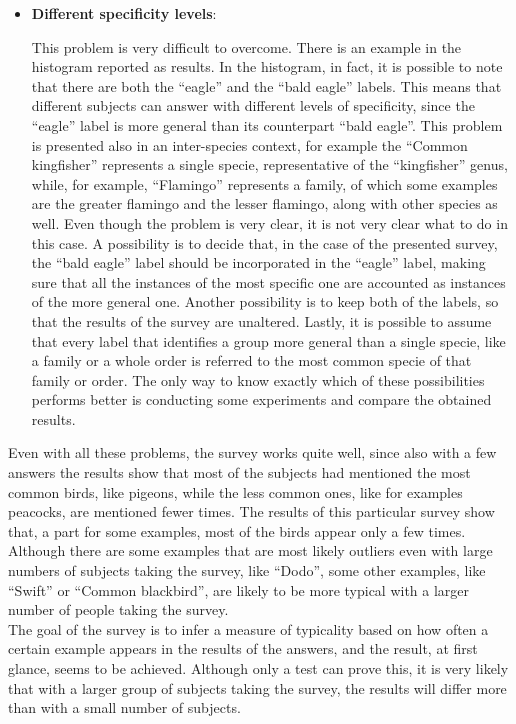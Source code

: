 \documentclass[conference]{IEEEtran}
\begin{document}
\begin{itemize}
			\item \textbf{Different specificity levels}:
			
				This problem is very difficult to overcome. There is an example in the histogram reported as results. In the histogram, in fact, it is possible to note that there are both the ``eagle'' and 
				the ``bald eagle'' labels. This means that different subjects can answer with different levels of specificity, since the ``eagle'' label is more general than its counterpart ``bald eagle''. 
				This problem is presented also in an inter-species context, for example the ``Common kingfisher'' represents a single specie, representative of the ``kingfisher'' genus, while, for example, 
				``Flamingo'' represents a family, of which some examples are the greater flamingo and the lesser flamingo, along with other species as well. 
				Even though the problem is very clear, it is not very clear what to do in this case. A possibility is to decide that, in the case of the presented survey, 
				the ``bald eagle'' label should be incorporated in the ``eagle'' 
				label, making sure that all the instances of the most specific one are accounted as instances of the more general one. Another possibility is to keep both of the labels, so that the results of 
				the survey are unaltered. Lastly, it is possible to assume that every label that identifies a group more general than a single specie, like a family or a whole order is referred to the most 
				common specie of that family or order. The only way to know exactly which of these possibilities performs better is conducting some experiments and compare the obtained results.
		
		\end{itemize}
		
		\noindent Even with all these problems, the survey works quite well, since also with a few answers the results show that most of the subjects had mentioned the most common birds, like pigeons, while the 
		less common ones, like for examples peacocks, are mentioned fewer times. The results of this particular survey show that, a part for some examples, most of the birds appear only a few times. Although there 
		are some examples that are most likely outliers even with large numbers of subjects taking the survey, like ``Dodo'', some other examples, like ``Swift'' or ``Common blackbird'', 
		are likely to be more typical with a larger number of people taking the survey.\\
		The goal of the survey is to infer a measure of typicality based on how often a certain example appears in the results of the answers, and the result, at first glance, seems to be achieved. Although only 
		a test can prove this, it is very likely that with a larger group of subjects taking the survey, the results will differ more than with a small number of subjects.
		
\end{document}
